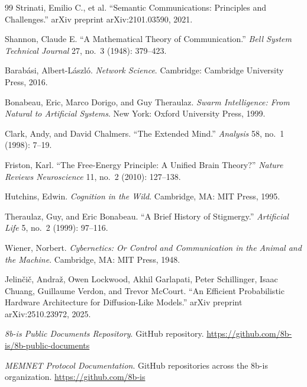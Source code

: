\documentclass[11pt,a4paper]{article}
\begin{document}
\begin{thebibliography}{99}
Strinati, Emilio C., et al.
``Semantic Communications: Principles and Challenges.''
arXiv preprint arXiv:2101.03590, 2021.

Shannon, Claude E.
``A Mathematical Theory of Communication.''
\textit{Bell System Technical Journal} 27, no.\ 3 (1948): 379--423.

Barab\'{a}si, Albert-L\'{a}szl\'{o}.
\textit{Network Science}.
Cambridge: Cambridge University Press, 2016.


Bonabeau, Eric, Marco Dorigo, and Guy Theraulaz.
\textit{Swarm Intelligence: From Natural to Artificial Systems}.
New York: Oxford University Press, 1999.

Clark, Andy, and David Chalmers.
``The Extended Mind.''
\textit{Analysis} 58, no.\ 1 (1998): 7--19.

Friston, Karl.
``The Free-Energy Principle: A Unified Brain Theory?''
\textit{Nature Reviews Neuroscience} 11, no.\ 2 (2010): 127--138.

Hutchins, Edwin.
\textit{Cognition in the Wild}.
Cambridge, MA: MIT Press, 1995.

Theraulaz, Guy, and Eric Bonabeau.
``A Brief History of Stigmergy.''
\textit{Artificial Life} 5, no.\ 2 (1999): 97--116.

Wiener, Norbert.
\textit{Cybernetics: Or Control and Communication in the Animal and the Machine}.
Cambridge, MA: MIT Press, 1948.


Jelinčič, Andraž, Owen Lockwood, Akhil Garlapati, Peter Schillinger, Isaac Chuang,
Guillaume Verdon, and Trevor McCourt.
``An Efficient Probabilistic Hardware Architecture for Diffusion-Like Models.''
arXiv preprint arXiv:2510.23972, 2025.


\textit{8b-is Public Documents Repository}.
GitHub repository.
\url{https://github.com/8b-is/8b-public-documents}

\textit{MEMNET Protocol Documentation}.
GitHub repositories across the 8b-is organization.
\url{https://github.com/8b-is}

\end{thebibliography}
\end{document}
